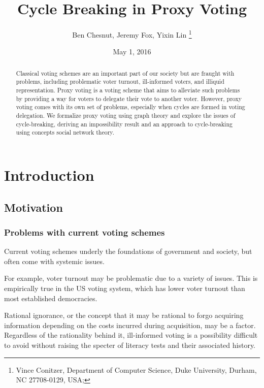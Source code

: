 \documentclass[10pt]{article}
\theoremstyle{definition}
\begin{document}
  
\title{Cycle Breaking in Proxy Voting
}
\date{May 1, 2016}

\author{
Ben Chesnut, Jeremy Fox, Yixin Lin \thanks{%
Vince Conitzer, Department of Computer Science, Duke University, Durham, NC
27708-0129, USA;}}

\maketitle

\section{Introduction}

\begin{abstract}

Classical voting schemes are an important part of our society but are fraught with problems, including problematic voter turnout, ill-informed voters, and illiquid representation. Proxy voting is a voting scheme that aims to alleviate such problems by providing a way for voters to delegate their vote to another voter. However, proxy voting comes with its own set of problems, especially when cycles are formed in voting delegation. We formalize proxy voting using graph theory and explore the issues of cycle-breaking, deriving an impossibility result and an approach to cycle-breaking using concepts social network theory.

\end{abstract}

\subsection{Motivation}

\subsubsection{Problems with current voting schemes}

Current voting schemes underly the foundations of government and society, but often come with systemic issues. 

For example, voter turnout may be problematic due to a variety of issues. This is empirically true in the US voting system\cite{turnout}, which has lower voter turnout than most established democracies. 

Rational ignorance\cite{rationalIgnorance}, or the concept that it may be rational to forgo acquiring information depending on the costs incurred during acquisition, may be a factor. Regardless of the rationality behind it, ill-informed voting is a possibility difficult to avoid without raising the specter of literacy tests and their associated history.
\end{document}
